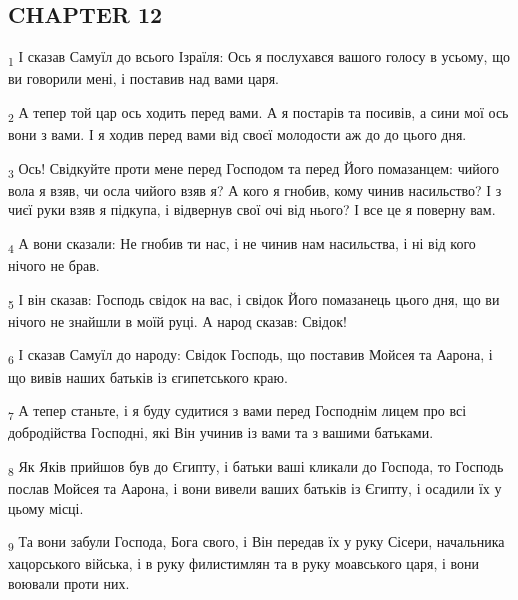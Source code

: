 \subsection{CHAPTER 12}
\begin{tcolorbox}
\textsubscript{1} І сказав Самуїл до всього Ізраїля: Ось я послухався вашого голосу в усьому, що ви говорили мені, і поставив над вами царя.
\end{tcolorbox}
\begin{tcolorbox}
\textsubscript{2} А тепер той цар ось ходить перед вами. А я постарів та посивів, а сини мої ось вони з вами. І я ходив перед вами від своєї молодости аж до до цього дня.
\end{tcolorbox}
\begin{tcolorbox}
\textsubscript{3} Ось! Свідкуйте проти мене перед Господом та перед Його помазанцем: чийого вола я взяв, чи осла чийого взяв я? А кого я гнобив, кому чинив насильство? І з чиєї руки взяв я підкупа, і відвернув свої очі від нього? І все це я поверну вам.
\end{tcolorbox}
\begin{tcolorbox}
\textsubscript{4} А вони сказали: Не гнобив ти нас, і не чинив нам насильства, і ні від кого нічого не брав.
\end{tcolorbox}
\begin{tcolorbox}
\textsubscript{5} І він сказав: Господь свідок на вас, і свідок Його помазанець цього дня, що ви нічого не знайшли в моїй руці. А народ сказав: Свідок!
\end{tcolorbox}
\begin{tcolorbox}
\textsubscript{6} І сказав Самуїл до народу: Свідок Господь, що поставив Мойсея та Аарона, і що вивів наших батьків із єгипетського краю.
\end{tcolorbox}
\begin{tcolorbox}
\textsubscript{7} А тепер станьте, і я буду судитися з вами перед Господнім лицем про всі добродійства Господні, які Він учинив із вами та з вашими батьками.
\end{tcolorbox}
\begin{tcolorbox}
\textsubscript{8} Як Яків прийшов був до Єгипту, і батьки ваші кликали до Господа, то Господь послав Мойсея та Аарона, і вони вивели ваших батьків із Єгипту, і осадили їх у цьому місці.
\end{tcolorbox}
\begin{tcolorbox}
\textsubscript{9} Та вони забули Господа, Бога свого, і Він передав їх у руку Сісери, начальника хацорського війська, і в руку филистимлян та в руку моавського царя, і вони воювали проти них.
\end{tcolorbox}
